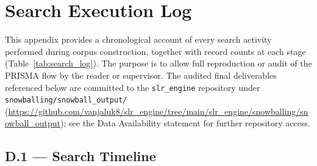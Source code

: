 
\section[\appendixname~\thesection]{Search Execution Log}
\label{app:search_log}

This appendix provides a chronological account of every search activity performed
during corpus construction, together with record counts at each stage
(Table~\ref{tab:search_log}). The purpose
is to allow full reproduction or audit of the PRISMA flow by the reader or supervisor.
The audited final deliverables referenced below are committed to the
\texttt{slr\_engine} repository under
\texttt{snowballing/snowball\_output/}
(\url{https://github.com/vanjaluk8/slr_engine/tree/main/slr_engine/snowballing/snowball_output});
see the Data Availability statement for further repository access.

\subsection*{D.1 — Search Timeline}
\label{app:search_log:timeline}


